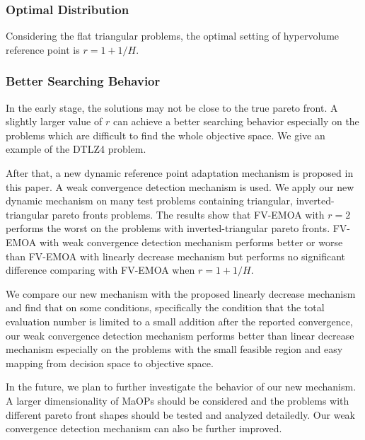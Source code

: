 \documentclass[conference]{IEEEtran}
\begin{document}
\subsubsection{Optimal Distribution} Considering the flat triangular problems, 
the optimal setting of hypervolume reference point is $r=1+1/H$. 
\subsubsection{Better Searching Behavior} In the early stage, 
the solutions may not be close to the true pareto front. 
A slightly larger value of $r$ can achieve a better searching behavior 
especially on the problems which are difficult to find the whole objective space. 
We give an example of the DTLZ4 problem. 

After that, a new dynamic reference point adaptation mechanism is proposed in this paper.
A weak convergence detection mechanism is used. 
We apply our new dynamic mechanism on many test problems containing triangular, inverted-triangular pareto fronts problems.
The results show that FV-EMOA with $r=2$ performs the worst on the problems with inverted-triangular pareto fronts. 
FV-EMOA with weak convergence detection mechanism performs better or worse than FV-EMOA with linearly decrease mechanism
but performs no significant difference comparing with FV-EMOA when $r=1+1/H$.

We compare our new mechanism with the proposed linearly decrease mechanism and find that
on some conditions, specifically the condition that the total evaluation number 
is limited to a small addition after the reported convergence, 
our weak convergence detection mechanism performs better than linear decrease mechanism
especially on the problems with the small feasible region and easy mapping from decision space to objective space. 

In the future, we plan to further investigate the behavior of our new mechanism. 
A larger dimensionality of MaOPs should be considered 
and the problems with different pareto front shapes should be tested and analyzed detailedly. 
Our weak convergence detection mechanism can also be further improved.

 
 
\end{document}
